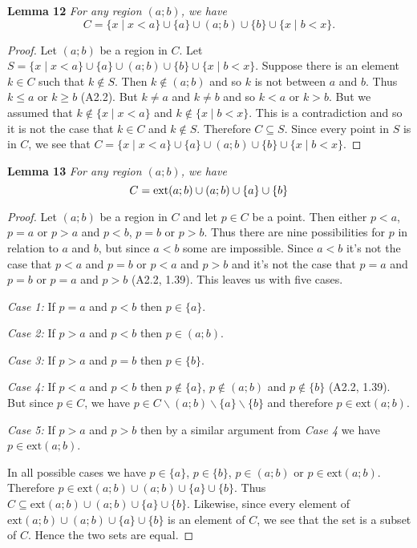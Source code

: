 \documentclass{article}
\begin{document}
\begin{flushleft}
\textbf{Lemma 12}
\textsl{For any region $(a;b)$, we have}
\[
C = \{ x \mid x < a \} \cup \{a\} \cup (a;b) \cup \{b\} \cup \{ x \mid b < x \}.
\]
\begin{proof}
Let $(a;b)$ be a region in $C$. Let $S = \{ x \mid x < a \} \cup \{a\} \cup (a;b) \cup \{b\} \cup \{ x \mid b < x \}$. Suppose there is an element $k \in C$ such that $k \notin S$. Then $k \notin (a;b)$ and so $k$ is not between $a$ and $b$. Thus $k \leq a$ or $k \geq b$ (A2.2). But $k \neq a$ and $k \neq b$ and so $k<a$ or $k>b$. But we assumed that $k \notin \{ x \mid x < a \}$ and $k \notin \{ x \mid b < x \}$. This is a contradiction and so it is not the case that $k \in C$ and $k \notin S$. Therefore $C \subseteq S$. Since every point in $S$ is in $C$, we see that $C = \{ x \mid x < a \} \cup \{a\} \cup (a;b) \cup \{b\} \cup \{ x \mid b < x \}$.
\end{proof}

\textbf{Lemma 13}
\textsl{For any region $(a;b)$, we have
\[
C = \textup{ext} (a;b) \cup (a;b) \cup \{a\} \cup \{b\}
\]}
\begin{proof}
Let $(a;b)$ be a region in $C$ and let $p \in C$ be a point. Then either $p<a$, $p=a$ or $p>a$ and $p<b$, $p=b$ or $p>b$. Thus there are nine possibilities for $p$ in relation to $a$ and $b$, but since $a<b$ some are impossible. Since $a<b$ it's not the case that $p<a$ and $p=b$ or $p<a$ and $p>b$ and it's not the case that $p=a$ and $p=b$ or $p=a$ and $p>b$ (A2.2, 1.39). This leaves us with five cases.\newline

\textit{Case 1:} If $p=a$ and $p<b$ then $p \in \{a\}$.\newline

\textit{Case 2:} If $p>a$ and $p<b$ then $p \in (a;b)$.\newline

\textit{Case 3:} If $p>a$ and $p=b$ then $p \in \{b\}$.\newline

\textit{Case 4:} If $p<a$ and $p<b$ then $p \notin \{a\}$, $p \notin (a;b)$ and $p \notin \{b\}$ (A2.2, 1.39). But since $p \in C$, we have $p \in C \backslash (a;b) \backslash \{a\} \backslash \{b\}$ and therefore $p \in \text{ext}(a;b)$.\newline

\textit{Case 5:} If $p>a$ and $p>b$ then by a similar argument from \textit{Case 4} we have $p \in \text{ext}(a;b)$.\newline

In all possible cases we have $p \in \{a\}$, $p \in \{b\}$, $p \in (a;b)$ or $p \in \text{ext}(a;b)$. Therefore $p \in \text{ext} (a;b) \cup (a;b) \cup \{a\} \cup \{b\}$. Thus $C \subseteq \text{ext}(a;b) \cup (a;b) \cup \{a\} \cup \{b\}$. Likewise, since every element of $\text{ext}(a;b) \cup (a;b) \cup \{a\} \cup \{b\}$ is an element of $C$, we see that the set is a subset of $C$. Hence the two sets are equal.
\end{proof}


\end{flushleft}
\end{document}
